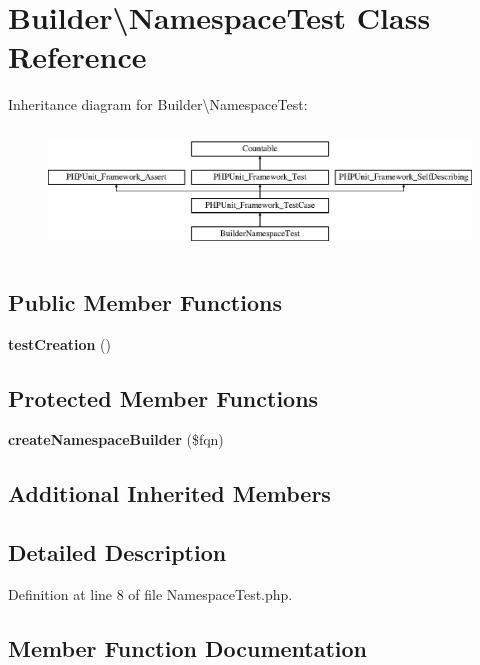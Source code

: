 \section{Builder\textbackslash{}Namespace\+Test Class Reference}
\label{class_php_parser_1_1_builder_1_1_namespace_test}
Inheritance diagram for Builder\textbackslash{}Namespace\+Test\+:\begin{figure}[H]
\begin{center}
\leavevmode
\includegraphics[height=3.303835cm]{class_php_parser_1_1_builder_1_1_namespace_test}
\end{center}
\end{figure}
\subsection*{Public Member Functions}
\begin{DoxyCompactItemize}
\item 
{\bf test\+Creation} ()
\end{DoxyCompactItemize}
\subsection*{Protected Member Functions}
\begin{DoxyCompactItemize}
\item 
{\bf create\+Namespace\+Builder} (\$fqn)
\end{DoxyCompactItemize}
\subsection*{Additional Inherited Members}


\subsection{Detailed Description}


Definition at line 8 of file Namespace\+Test.\+php.



\subsection{Member Function Documentation}
